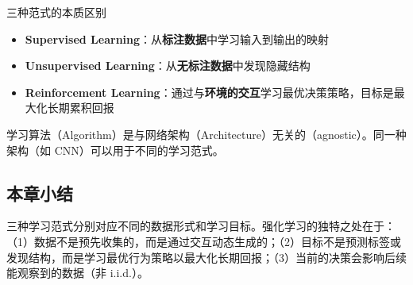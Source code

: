 \begin{importantbox}{三种范式的本质区别}
\begin{itemize}
    \item \textbf{Supervised Learning}：从\textbf{标注数据}中学习输入到输出的映射
    \item \textbf{Unsupervised Learning}：从\textbf{无标注数据}中发现隐藏结构
    \item \textbf{Reinforcement Learning}：通过与\textbf{环境的交互}学习最优决策策略，目标是最大化长期累积回报
\end{itemize}
学习算法（Algorithm）是与网络架构（Architecture）无关的（agnostic）。同一种架构（如 CNN）可以用于不同的学习范式。
\end{importantbox}

\subsection{本章小结}
三种学习范式分别对应不同的数据形式和学习目标。强化学习的独特之处在于：（1）数据不是预先收集的，而是通过交互动态生成的；（2）目标不是预测标签或发现结构，而是学习最优行为策略以最大化长期回报；（3）当前的决策会影响后续能观察到的数据（非 i.i.d.）。


